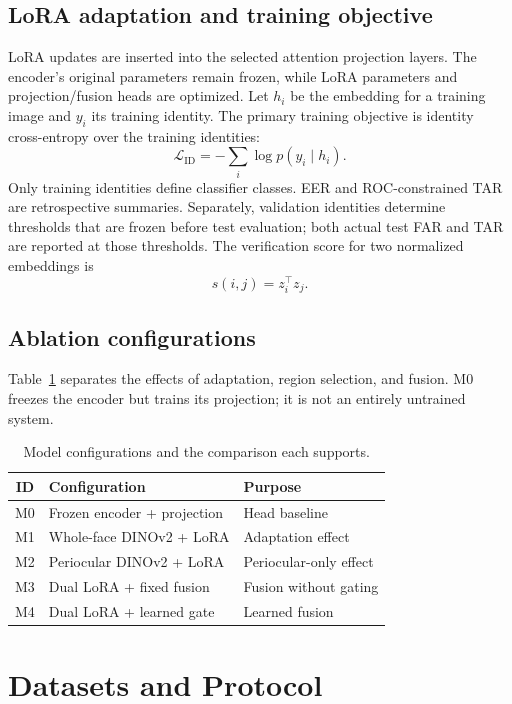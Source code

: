 \documentclass[12pt,a4paper,oneside]{report}
\begin{document}
\section{LoRA adaptation and training objective}
LoRA updates are inserted into the selected attention projection layers. The encoder's original parameters remain frozen, while LoRA parameters and projection/fusion heads are optimized. Let $h_i$ be the embedding for a training image and $y_i$ its training identity. The primary training objective is identity cross-entropy over the training identities:
\begin{equation}
 \mathcal{L}_{\mathrm{ID}}=-\sum_i\log p(y_i\mid h_i).
\end{equation}
Only training identities define classifier classes. EER and ROC-constrained TAR are retrospective summaries. Separately, validation identities determine thresholds that are frozen before test evaluation; both actual test FAR and TAR are reported at those thresholds. The verification score for two normalized embeddings is
\begin{equation}
 s(i,j)=z_i^\top z_j.
\end{equation}

\section{Ablation configurations}
Table~\ref{tab:ablations} separates the effects of adaptation, region selection, and fusion. M0 freezes the encoder but trains its projection; it is not an entirely untrained system.
\begin{table}[t]
\centering
\caption{Model configurations and the comparison each supports.}
\label{tab:ablations}
\begin{tabular}{cll}
\toprule
ID & Configuration & Purpose\\
\midrule
M0 & Frozen encoder + projection & Head baseline\\
M1 & Whole-face DINOv2 + LoRA & Adaptation effect\\
M2 & Periocular DINOv2 + LoRA & Periocular-only effect\\
M3 & Dual LoRA + fixed fusion & Fusion without gating\\
M4 & Dual LoRA + learned gate & Learned fusion\\
\bottomrule
\end{tabular}
\end{table}


\chapter{Datasets and Protocol}
\end{document}
